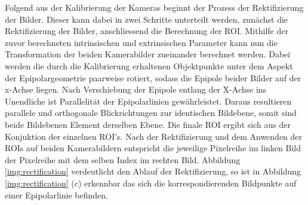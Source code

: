 \noindent
Folgend aus der Kalibrierung der Kameras beginnt der Prozess der Rektifizierung der Bilder. Dieser kann dabei in zwei Schritte unterteilt werden, zunächst die Rektifizierung der Bilder, anschliessend die Berechnung der ROI. Mithilfe der zuvor berechneten intrinsischen und extrinsischen Parameter kann nun die Transformation der beiden Kamerabilder zueinander berechnet werden. Dabei werden die durch die Kalibrierung erhaltenen Objektpunkte unter dem Aspekt der Epipolargeometrie paarweise rotiert, sodass die Epipole beider Bilder auf der x-Achse liegen. Nach Verschiebung der Epipole entlang der X-Achse ins Unendliche ist Parallelität der Epipolarlinien gewährleistet. Daraus resultieren parallele und orthogonale Blickrichtungen zur identischen Bildebene, somit sind beide Bildebenen Element derselben Ebene. Die finale ROI ergibt sich aus der Konjuktion der einzelnen ROI's. Nach der Rektifizierung und dem Anwenden der ROIs auf beiden Kamerabildern entspricht die jeweilige Pixelreihe im linken Bild der Pixelreihe mit dem selben Index im rechten Bild. Abbildung \ref{img:rectification} verdeutlicht den Ablauf der Rektifizierung, so ist in Abbildung \ref{img:rectification} (c) erkennbar das sich die korrespondierenden Bildpunkte auf einer Epipolarlinie befinden.\\

